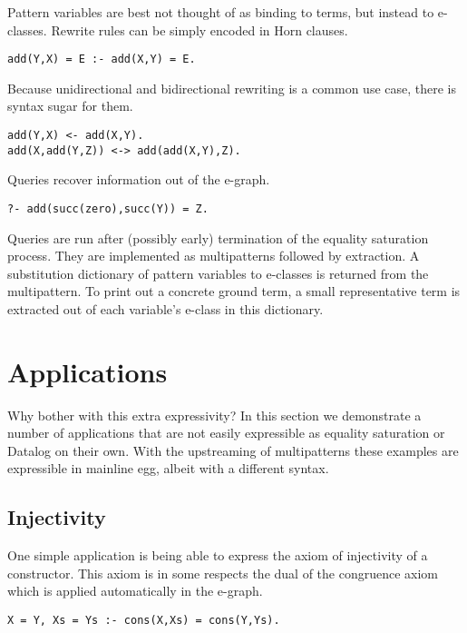 \documentclass[sigplan,10pt,review]{acmart} %
\begin{document}
Pattern variables are best not thought of as binding to terms, but instead to e-classes. Rewrite rules can be simply encoded in Horn clauses.

\begin{lstlisting}
add(Y,X) = E :- add(X,Y) = E.
\end{lstlisting}

Because unidirectional and bidirectional rewriting is a common use case, there is syntax sugar for them.

\begin{lstlisting}
add(Y,X) <- add(X,Y).
add(X,add(Y,Z)) <-> add(add(X,Y),Z).
\end{lstlisting}

Queries recover information out of the e-graph.

\begin{lstlisting}
?- add(succ(zero),succ(Y)) = Z.
\end{lstlisting}

Queries are run after (possibly early) termination of the equality saturation process. They are implemented as multipatterns followed by extraction. A substitution dictionary of pattern variables to e-classes is returned from the multipattern. To print out a concrete ground term, a small representative term is extracted out of each variable's e-class in this dictionary.

\section{Applications}
Why bother with this extra expressivity? In this section we demonstrate a number of applications that are not easily expressible as equality saturation or Datalog on their own. With the upstreaming of multipatterns these examples are expressible in mainline egg, albeit with a different syntax.

\subsection{Injectivity}
One simple application is being able to express the axiom of injectivity of a constructor. This axiom is in some respects the dual of the congruence axiom which is applied automatically in the e-graph.

\begin{lstlisting}
X = Y, Xs = Ys :- cons(X,Xs) = cons(Y,Ys).
\end{lstlisting}
\end{document}
